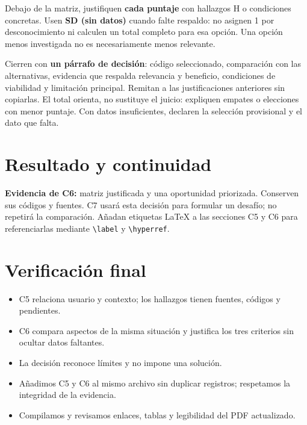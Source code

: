\documentclass[12pt,a4paper]{article}
\newcommand{\concept}[1]{\textcolor{ConceptColor}{\textbf{#1}}}
\newcommand{\checkbox}{\fbox{\rule{0pt}{0.8ex}\rule{0.8ex}{0pt}}}
\begin{document}
Debajo de la matriz, justifiquen \textbf{cada puntaje} con hallazgos H o condiciones concretas. Usen \textbf{SD (sin datos)} cuando falte respaldo: no asignen 1 por desconocimiento ni calculen un total completo para esa opción. Una opción menos investigada no es necesariamente menos relevante.

Cierren con \textbf{un párrafo de decisión}: código seleccionado, comparación con las alternativas, evidencia que respalda relevancia y beneficio, condiciones de viabilidad y limitación principal. Remitan a las justificaciones anteriores sin copiarlas. El total orienta, no sustituye el juicio: expliquen empates o elecciones con menor puntaje. Con datos insuficientes, declaren la selección provisional y el dato que falta.

\section*{Resultado y continuidad}
\concept{Evidencia de C6:} matriz justificada y una oportunidad priorizada. Conserven sus códigos y fuentes. C7 usará esta decisión para formular un desafío; no repetirá la comparación. Añadan etiquetas LaTeX a las secciones C5 y C6 para referenciarlas mediante \texttt{\textbackslash label} y \texttt{\textbackslash hyperref}.

\section*{Verificación final}
{\small\begin{itemize}[label=\checkbox]
\item C5 relaciona usuario y contexto; los hallazgos tienen fuentes, códigos y pendientes.
\item C6 compara aspectos de la misma situación y justifica los tres criterios sin ocultar datos faltantes.
\item La decisión reconoce límites y no impone una solución.
\item Añadimos C5 y C6 al mismo archivo sin duplicar registros; respetamos la integridad de la evidencia.
\item Compilamos y revisamos enlaces, tablas y legibilidad del PDF actualizado.
\end{itemize}}
\end{document}
